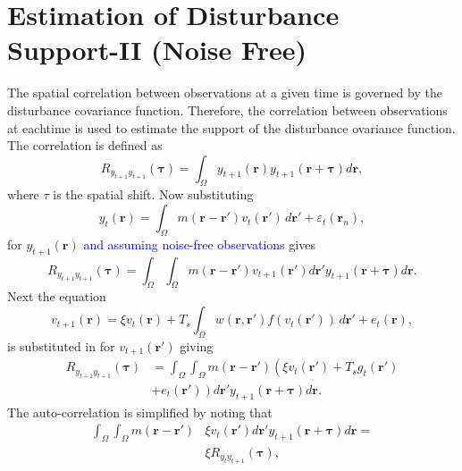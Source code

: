 \documentclass[]{article}
\newcommand{\parham}[1]{\textcolor{blue}{#1}}
\begin{document}
\section*{Estimation of Disturbance Support-II (Noise Free)}
The spatial correlation between observations at a given time is governed by the disturbance covariance function. Therefore, the correlation between observations at eachtime is used to estimate the support of the disturbance ovariance function. The correlation is defined as
\begin{equation}
	R_{y_{t+1}y_{t+1}}(\boldsymbol{\tau}) = \int_{\Omega} y_{t+1}(\mathbf{r}) y_{t+1}(\mathbf{r}+\boldsymbol{\tau}) d\mathbf{r},
\end{equation}
where $\tau$ is the spatial shift. Now substituting 
\begin{equation}\label{eq:ObservationEquation}
	y_t(\mathbf{r}) = \int_{\Omega} { m\left(\mathbf{r}-\mathbf{r}'\right) v_t\left(\mathbf{r}'\right) \, d\mathbf{r}'} + \varepsilon_t(\mathbf{r}_n), 
\end{equation}
for  $y_{t+1}(\mathbf{r})$ \parham{and assuming noise-free observations} gives 
\begin{equation}
	R_{y_{t+1}y_{t+1}}(\boldsymbol{\tau}) = \int_{\Omega}\int_{\Omega} m(\mathbf{r}-\mathbf{r}')v_{t+1}(\mathbf{r}')d\mathbf{r}' y_{t+1}(\mathbf{r}+\boldsymbol{\tau}) d\mathbf{r}.
\end{equation}
Next the equation
\begin{equation}
	\label{eq:DiscreteTimeModel} 
	v_{t+1}\left(\mathbf{r}\right) = 
	\xi v_t\left(\mathbf{r}\right) + 
	T_s \int_\Omega { 
	    w\left(\mathbf{r},\mathbf{r}'\right)
	    f\left(v_t\left(\mathbf{r}'\right)\right) 
	\, d\mathbf{r}'} 
	+ e_t\left(\mathbf{r}\right), 
\end{equation}
is substituted in for  $v_{t+1}(\mathbf{r}')$ giving 
\begin{align}
	R_{y_{t+1}y_{t+1}}(\boldsymbol{\tau}) &= \int_{\Omega}\int_{\Omega} m(\mathbf{r}-\mathbf{r}')\left(\xi v_t(\mathbf{r}') +  T_s g_t(\mathbf{r}')\right. \nonumber \\
	&+ \left. e_t(\mathbf{r}')\right) d\mathbf{r}' y_{t+1}(\mathbf{r}+\boldsymbol{\tau}) d\mathbf{r}. 
\end{align}
The auto-correlation is simplified by noting that
\begin{align}
	\int_{\Omega}\int_{\Omega} m(\mathbf{r}-\mathbf{r}')&\xi v_t(\mathbf{r}')d\mathbf{r}'y_{t+1}(\mathbf{r}+\boldsymbol{\tau}) d\mathbf{r} = \nonumber \\ 
 &\xi R_{y_ty_{t+1}}(\boldsymbol{\tau}),
\end{align}
\end{document}
